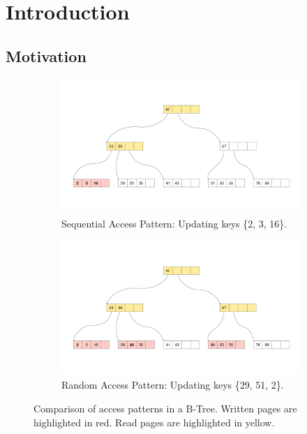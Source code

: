 
\chapter{Introduction}\label{chapter:introduction}

\section{Motivation}
\begin{figure}[htpb]
  \centering
  \begin{subfigure}[t]{0.95\textwidth}
    \centering
    \includegraphics[width=\textwidth]{figures/sequential_access.pdf}
    \caption{Sequential Access Pattern: Updating keys \{2, 3, 16\}.}
    \label{fig:second-pdf}
  \end{subfigure}
  \hfill
  \begin{subfigure}[t]{0.95\textwidth}
    \centering
    \includegraphics[width=\textwidth]{figures/random_access.pdf}
    \caption{Random Access Pattern: Updating keys \{29, 51, 2\}.}
    \label{fig:first-pdf}
  \end{subfigure}
  \caption{Comparison of access patterns in a B-Tree. Written pages are highlighted in red. Read pages are highlighted in yellow.}
  \label{fig:access-pattern-comparison}
\end{figure}

